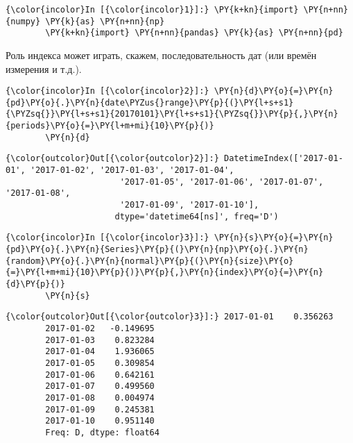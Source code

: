     \begin{Verbatim}[commandchars=\\\{\}]
{\color{incolor}In [{\color{incolor}1}]:} \PY{k+kn}{import} \PY{n+nn}{numpy} \PY{k}{as} \PY{n+nn}{np}
        \PY{k+kn}{import} \PY{n+nn}{pandas} \PY{k}{as} \PY{n+nn}{pd}
\end{Verbatim}

    Роль индекса может играть, скажем, последовательность дат (или времён
измерения и т.д.).

    \begin{Verbatim}[commandchars=\\\{\}]
{\color{incolor}In [{\color{incolor}2}]:} \PY{n}{d}\PY{o}{=}\PY{n}{pd}\PY{o}{.}\PY{n}{date\PYZus{}range}\PY{p}{(}\PY{l+s+s1}{\PYZsq{}}\PY{l+s+s1}{20170101}\PY{l+s+s1}{\PYZsq{}}\PY{p}{,}\PY{n}{periods}\PY{o}{=}\PY{l+m+mi}{10}\PY{p}{)}
        \PY{n}{d}
\end{Verbatim}

            \begin{Verbatim}[commandchars=\\\{\}]
{\color{outcolor}Out[{\color{outcolor}2}]:} DatetimeIndex(['2017-01-01', '2017-01-02', '2017-01-03', '2017-01-04',
                       '2017-01-05', '2017-01-06', '2017-01-07', '2017-01-08',
                       '2017-01-09', '2017-01-10'],
                      dtype='datetime64[ns]', freq='D')
\end{Verbatim}
        
    \begin{Verbatim}[commandchars=\\\{\}]
{\color{incolor}In [{\color{incolor}3}]:} \PY{n}{s}\PY{o}{=}\PY{n}{pd}\PY{o}{.}\PY{n}{Series}\PY{p}{(}\PY{n}{np}\PY{o}{.}\PY{n}{random}\PY{o}{.}\PY{n}{normal}\PY{p}{(}\PY{n}{size}\PY{o}{=}\PY{l+m+mi}{10}\PY{p}{)}\PY{p}{,}\PY{n}{index}\PY{o}{=}\PY{n}{d}\PY{p}{)}
        \PY{n}{s}
\end{Verbatim}

            \begin{Verbatim}[commandchars=\\\{\}]
{\color{outcolor}Out[{\color{outcolor}3}]:} 2017-01-01    0.356263
        2017-01-02   -0.149695
        2017-01-03    0.823284
        2017-01-04    1.936065
        2017-01-05    0.309854
        2017-01-06    0.642161
        2017-01-07    0.499560
        2017-01-08    0.004974
        2017-01-09    0.245381
        2017-01-10    0.951140
        Freq: D, dtype: float64
\end{Verbatim}
        
